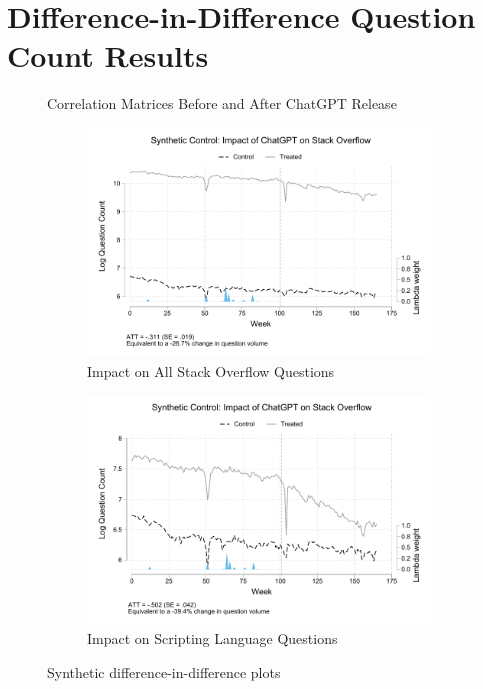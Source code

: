\appendix

\section{Difference-in-Difference Question Count Results}\label{app:did}

\begin{figure}[htpb!]
    \centering
    
    \caption{Correlation Matrices Before and After ChatGPT Release}
    \label{fig:app-correlation_matrix}
\end{figure}


\begin{figure}[htpb!]
    \centering
    \begin{subfigure}[b]{0.475\textwidth}
        \centering
        \includegraphics[width=1\textwidth]{imgs/stata/sdid_all_trends101.pdf}
        \caption{Impact on All Stack Overflow Questions}
        \label{fig:app-sdid_all}
    \end{subfigure}
    \hfill
    \begin{subfigure}[b]{0.475\textwidth}
        \centering
        \includegraphics[width=1\textwidth]{imgs/stata/sdid_script_trends101.pdf}
        \caption{Impact on Scripting Language Questions}
        \label{fig:app-sdid_script}
    \end{subfigure}
    \caption{Synthetic difference-in-difference plots}
    \label{fig:app-DiD}
\end{figure}

